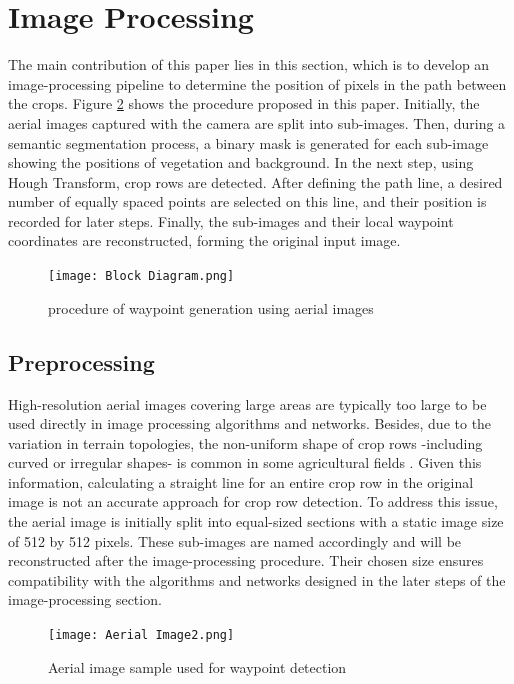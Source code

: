 \documentclass[conference]{IEEEtran}
\begin{document}
\section{Image Processing}\label{Image Processing}
The main contribution of this paper lies in this section, which is to develop an image-processing pipeline to determine the position of pixels in the path between the crops. Figure
\ref{fig1}
shows the procedure proposed in this paper. Initially, the aerial images captured with the camera are split into sub-images. Then, during a semantic segmentation process, a binary mask is generated for each sub-image showing the positions of vegetation and background. In the next step, using Hough Transform, crop rows are detected. After defining the path line, a desired number of equally spaced points are selected on this line, and their position is recorded for later steps. Finally, the sub-images and their local waypoint coordinates are reconstructed, forming the original input image.

\begin{figure}[htbp]
\texttt{[image: Block Diagram.png]}
\caption{procedure of waypoint generation using aerial images
\cite{b5}}
\label{fig1}
\end{figure}

\subsection{Preprocessing}\label{Preprocessing}
High-resolution aerial images covering large areas are typically too large to be used directly in image processing algorithms and networks. Besides, due to the variation in terrain topologies, the non-uniform shape of crop rows -including curved or irregular shapes- is common in some agricultural fields
\cite{b2, b3, b14}.
Given this information, calculating a straight line for an entire crop row in the original image is not an accurate approach for crop row detection.
To address this issue, the aerial image is initially split into equal-sized sections with a static image size of 512 by 512 pixels. These sub-images are named accordingly and will be reconstructed after the image-processing procedure. Their chosen size ensures compatibility with the algorithms and networks designed in the later steps of the image-processing section.


\begin{figure}[htbp]
\texttt{[image: Aerial Image2.png]}
\caption{Aerial image sample used for waypoint detection
\cite{b5}}
\label{fig1}
\end{figure}
\end{document}
